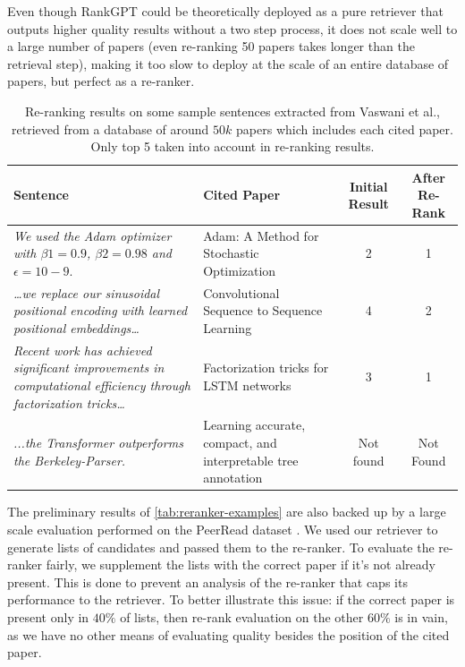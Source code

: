 \documentclass[12pt,a4paper]{report}
\begin{document}
Even though RankGPT \cite{Sun2023IsCG,Sun2023InstructionDM} could be theoretically deployed as a pure retriever that outputs higher quality results without a two step process, it does not scale well to a large number of papers (even re-ranking 50 papers takes longer than the retrieval step), making it too slow to deploy at the scale of an entire database of papers, but perfect as a re-ranker.

\begin{table}[th]
\centering
\small
\setlength{\tabcolsep}{10pt}
\renewcommand{\arraystretch}{1.3}
\begin{tabularx}{\linewidth}{X X c c}
\toprule
\textbf{Sentence} & \textbf{Cited Paper} & \textbf{Initial Result} & \textbf{After Re-Rank} \\
\midrule
\textit{We used the Adam optimizer with \(\beta1 = 0.9\), \(\beta2 = 0.98\) and \(\epsilon = 10-9.\)} 
& Adam: A Method for Stochastic Optimization & 2 & 1 \\
\textit{…we replace our sinusoidal positional encoding with learned positional embeddings…}
 & Convolutional Sequence to Sequence Learning
 & 4 & 2 \\
\textit{Recent work has achieved significant improvements in computational efficiency through factorization tricks…}
 & Factorization tricks for LSTM networks
 & 3 & 1 \\
 \textit{...the Transformer outperforms the Berkeley-Parser.}
 & Learning accurate, compact, and interpretable tree annotation
 & Not found & Not Found
 \\
\bottomrule
\end{tabularx}
\caption{Re-ranking results on some sample sentences extracted from Vaswani et al.\cite{vaswani2023attentionneed}, retrieved from a database of around \(50k\) papers which includes each cited paper. Only top 5 taken into account in re-ranking results.}
\label{tab:reranker-examples}
\end{table}

The preliminary results of \autoref{tab:reranker-examples} are also backed up by a large scale evaluation performed on the PeerRead dataset \cite{Kang2018ADO}. We used our retriever to generate lists of candidates and passed them to the re-ranker. To evaluate the re-ranker fairly, we supplement the lists with the correct paper if it's not already present. This is done to prevent an analysis of the re-ranker that caps its performance to the retriever. To better illustrate this issue: if the correct paper is present only in \(40\%\) of lists, then re-rank evaluation on the other \(60\%\) is in vain, as we have no other means of evaluating quality besides the position of the cited paper.
\end{document}
